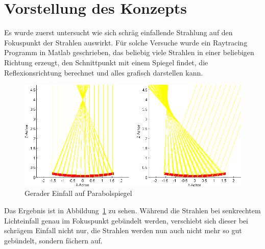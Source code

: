 \documentclass[fontsize=10pt,paper=a4,bibliography=totoc]{scrartcl}
\begin{document}
\section{Vorstellung des Konzepts}
Es wurde zuerst untersucht wie sich schräg einfallende Strahlung auf den Fokuspunkt der Strahlen auswirkt. Für solche Versuche wurde ein Raytracing Programm in Matlab geschrieben, das beliebig viele Strahlen in einer beliebigen Richtung erzeugt, den Schnittpunkt mit einem Spiegel findet, die Reflexionsrichtung berechnet und alles grafisch darstellen kann. 
\begin{figure}[htb]
	\centering
	\includegraphics[width=\textwidth]{images/2d_gerade_schraeg20.png}
	\caption{Gerader Einfall auf Parabolspiegel}
	\label{pic:2dreflektion}
\end{figure}
Das Ergebnis ist in Abbildung~\ref{pic:2dreflektion} zu sehen. Während die Strahlen bei senkrechtem Lichteinfall genau im Fokuspunkt gebündelt werden, verschiebt sich dieser
bei schrägem Einfall nicht nur, die Strahlen werden nun auch nicht mehr so gut gebündelt, sondern fächern auf.
\end{document}
